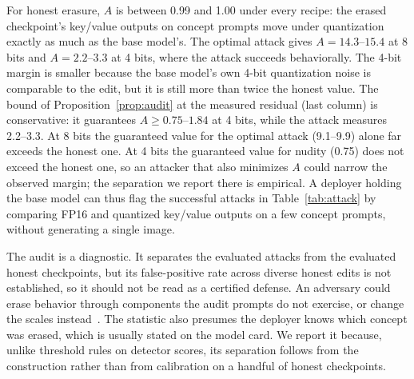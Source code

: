 For honest erasure, $A$ is between 0.99 and 1.00 under every recipe: the erased
checkpoint's key/value outputs on concept prompts move under quantization exactly as
much as the base model's. The optimal attack gives $A=14.3$--$15.4$ at 8 bits and
$A=2.2$--$3.3$ at 4 bits, where the attack succeeds behaviorally.
The 4-bit margin is smaller because the base model's own 4-bit quantization noise is
comparable to the edit, but it is still more than twice the honest value. The bound
of Proposition~\ref{prop:audit} at the measured residual (last column) is
conservative: it guarantees $A\ge0.75$--$1.84$ at 4 bits, while the attack measures
2.2--3.3. At 8 bits the guaranteed value for the optimal attack (9.1--9.9) alone far exceeds
the honest one. At 4 bits the guaranteed value for nudity (0.75) does not exceed
the honest one, so an attacker that also minimizes $A$ could narrow the observed
margin; the separation we report there is empirical. A deployer holding the base model can thus flag the successful attacks in
Table~\ref{tab:attack} by comparing FP16 and quantized key/value outputs on a few
concept prompts, without generating a single image.

The audit is a diagnostic. It separates the evaluated attacks from the evaluated
honest checkpoints, but its false-positive rate across diverse honest edits is not
established, so it should not be read as a certified defense. An adversary could erase
behavior through components the audit prompts do not exercise, or change the scales
instead~\cite{zhan2026}. The statistic also presumes the deployer knows which concept
was erased, which is usually stated on the model card. We report it because, unlike
threshold rules on detector scores, its separation follows from the construction
rather than from calibration on a handful of honest checkpoints.
